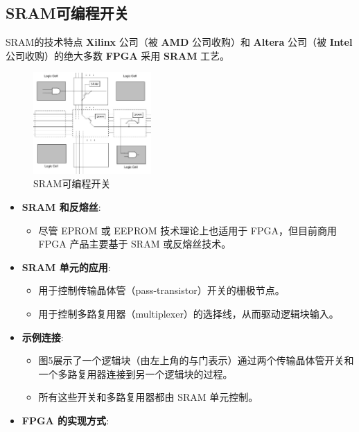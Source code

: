 \subsection{SRAM可编程开关}
\begin{frame}[allowframebreaks]{SRAM的技术特点}
\textbf{Xilinx} 公司（被 \textbf{AMD} 公司收购）和 \textbf{Altera}
公司（被 \textbf{Intel} 公司收购）的绝大多数 \textbf{FPGA} 采用
\textbf{SRAM} 工艺。
\begin{figure}
    \centering
    \includegraphics[width=0.4\textwidth]{img1/SRAM.jpeg}
    \caption{SRAM可编程开关}
\end{figure}

\begin{itemize}
\tightlist
\item
    \textbf{SRAM 和反熔丝}:

    \begin{itemize}
    \tightlist
    \item
    尽管 EPROM 或 EEPROM 技术理论上也适用于 FPGA，但目前商用 FPGA
    产品主要基于 SRAM 或反熔丝技术。
    \end{itemize}
\item
    \textbf{SRAM 单元的应用}:

    \begin{itemize}
    \tightlist
    \item
    用于控制传输晶体管（pass-transistor）开关的栅极节点。
    \item
    用于控制多路复用器（multiplexer）的选择线，从而驱动逻辑块输入。
    \end{itemize}
\end{itemize}


\begin{itemize}
\tightlist
\item
    \textbf{示例连接}:

    \begin{itemize}
    \tightlist
    \item
    图5展示了一个逻辑块（由左上角的与门表示）通过两个传输晶体管开关和一个多路复用器连接到另一个逻辑块的过程。
    \item
    所有这些开关和多路复用器都由 SRAM 单元控制。
    \end{itemize}
\item
    \textbf{FPGA 的实现方式}:


\end{itemize}
\end{frame}
